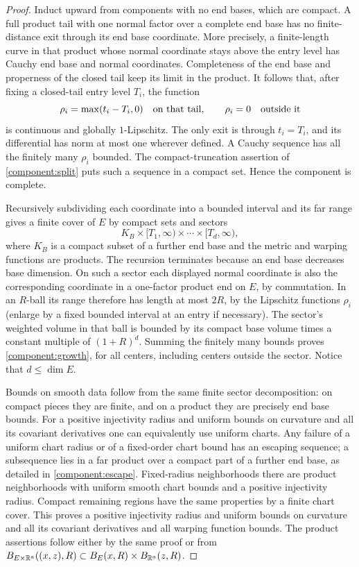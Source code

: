 \begin{proof}
Induct upward from components with no end bases, which are compact.
A full product tail with one normal factor over a complete end base has no finite-distance
exit through its end base coordinate.  More precisely, a finite-length
curve in that product whose normal coordinate stays above the entry
level has Cauchy end base and normal coordinates.  Completeness of the end base
and properness of the closed tail keep its limit in the product.
It follows that, after fixing a closed-tail entry level $T_i$, the
function
\[
 \rho_i=\max(t_i-T_i,0)\quad\hbox{on that tail},\qquad
 \rho_i=0\quad\hbox{outside it}
\]
is continuous and globally $1$-Lipschitz.  The only exit is through
$t_i=T_i$, and its differential has norm at most one wherever defined.
A Cauchy sequence has all the finitely many $\rho_i$ bounded.
The compact-truncation assertion of \cref{component:split} puts such a
sequence in a compact set.  Hence the component is complete.

Recursively subdividing each coordinate into a bounded interval and
its far range gives a finite cover of $E$ by compact sets and sectors
\begin{equation}\label{component:sector}
 K_B\times[T_1,\infty)\times\cdots\times[T_d,\infty),
\end{equation}
where $K_B$ is a compact subset of a further end base and the metric and
warping functions are products.  The recursion terminates because an end base decreases
base dimension.  On such a sector each displayed normal coordinate is
also the corresponding coordinate in a one-factor product end on $E$, by commutation.
In an $R$-ball its range therefore has length at most $2R$, by the
Lipschitz functions $\rho_i$ (enlarge by a fixed bounded interval at
an entry if necessary).  The sector's weighted volume in that ball
is bounded by its compact base volume times a constant multiple of
$(1+R)^d$.  Summing the finitely many bounds proves
\cref{component:growth}, for all centers, including centers outside the
sector.  Notice that $d\le\dim E$.

Bounds on smooth data follow from the same finite sector decomposition:
on compact pieces they are finite, and on a product they are precisely
end base bounds.  For a positive injectivity radius and uniform bounds on curvature and all its covariant derivatives one can equivalently use uniform
charts.  Any failure of a uniform chart radius or of a fixed-order
chart bound has an escaping sequence; a subsequence lies in a far
product over a compact part of a further end base, as detailed in
\cref{component:escape}.  Fixed-radius neighborhoods there are product
neighborhoods with uniform smooth chart bounds and a positive
injectivity radius.  Compact remaining regions have the same
properties by a finite chart cover.  This proves a positive injectivity radius and uniform bounds on curvature and all its covariant derivatives
and all warping function bounds.  The product assertions follow either by the
same proof or from
$B_{E\times\mathbb R^a}((x,z),R)\subset B_E(x,R)\times B_{\mathbb R^a}(z,R)$.
\end{proof}

